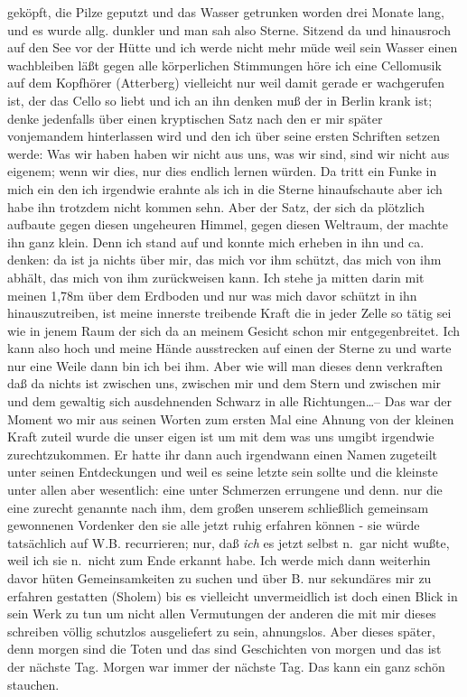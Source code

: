 \documentclass[
]{article}
\begin{document}
geköpft, die Pilze geputzt und das Wasser getrunken worden drei Monate
lang, und es wurde allg. dunkler und man sah also Sterne. Sitzend da und
hinausroch auf den See vor der Hütte und ich werde nicht mehr müde weil
sein Wasser einen wachbleiben läßt gegen alle körperlichen Stimmungen
höre ich eine Cellomusik auf dem Kopfhörer (Atterberg) vielleicht nur
weil damit gerade er wachgerufen ist, der das Cello so liebt und ich an
ihn denken muß der in Berlin krank ist; denke jedenfalls über einen
kryptischen Satz nach den er mir später vonjemandem hinterlassen wird
und den ich über seine ersten Schriften setzen werde: Was wir haben
haben wir nicht aus uns, was wir sind, sind wir nicht aus eigenem; wenn
wir dies, nur dies endlich lernen würden. Da tritt ein Funke in mich ein
den ich irgendwie erahnte als ich in die Sterne hinaufschaute aber ich
habe ihn trotzdem nicht kommen sehn. Aber der Satz, der sich da
plötzlich aufbaute gegen diesen ungeheuren Himmel, gegen diesen
Weltraum, der machte ihn ganz klein. Denn ich stand auf und konnte mich
erheben in ihn und ca. denken: da ist ja nichts über mir, das mich vor
ihm schützt, das mich von ihm abhält, das mich von ihm zurückweisen
kann. Ich stehe ja mitten darin mit meinen 1,78m über dem Erdboden und
nur was mich davor schützt in ihn hinauszutreiben, ist meine innerste
treibende Kraft die in jeder Zelle so tätig sei wie in jenem Raum der
sich da an meinem Gesicht schon mir entgegenbreitet. Ich kann also hoch
und meine Hände ausstrecken auf einen der Sterne zu und warte nur eine
Weile dann bin ich bei ihm. Aber wie will man dieses denn verkraften daß
da nichts ist zwischen uns, zwischen mir und dem Stern und zwischen mir
und dem gewaltig sich ausdehnenden Schwarz in alle Richtungen\ldots--
Das war der Moment wo mir aus seinen Worten zum ersten Mal eine Ahnung
von der kleinen Kraft zuteil wurde die unser eigen ist um mit dem was
uns umgibt irgendwie zurechtzukommen. Er hatte ihr dann auch irgendwann
einen Namen zugeteilt unter seinen Entdeckungen und weil es seine letzte
sein sollte und die kleinste unter allen aber wesentlich: eine unter
Schmerzen errungene und denn. nur die eine zurecht genannte nach ihm,
dem großen unserem schließlich gemeinsam gewonnenen Vordenker den sie
alle jetzt ruhig erfahren können - sie würde tatsächlich auf W.B.
recurrieren; nur, daß \emph{ich} es jetzt selbst n.~gar nicht wußte,
weil ich sie n.~nicht zum Ende erkannt habe. Ich werde mich dann
weiterhin davor hüten Gemeinsamkeiten zu suchen und über B. nur
sekundäres mir zu erfahren gestatten (Sholem) bis es vielleicht
unvermeidlich ist doch einen Blick in sein Werk zu tun um nicht allen
Vermutungen der anderen die mit mir dieses schreiben völlig schutzlos
ausgeliefert zu sein, ahnungslos. Aber dieses später, denn morgen sind
die Toten und das sind Geschichten von morgen und das ist der nächste
Tag. Morgen war immer der nächste Tag. Das kann ein ganz schön stauchen.
\end{document}
